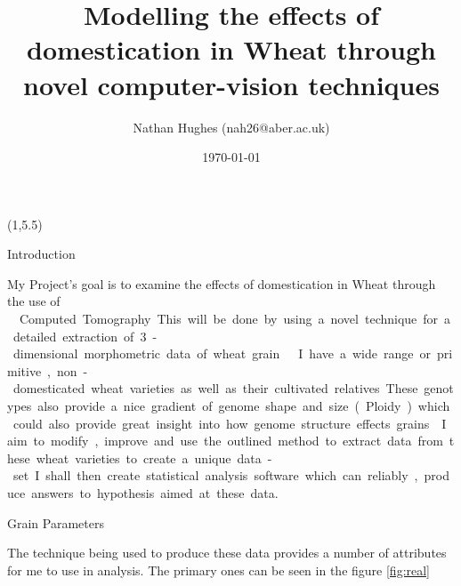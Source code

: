 \documentclass[final]{beamer}
\title{Modelling the effects of domestication in Wheat through novel computer-vision techniques}
\author{Nathan Hughes (nah26@aber.ac.uk)}
\date{\today}
\begin{document}
\begin{frame}{}

  \begin{textblock}{28}(1,5.5)

    \begin{block}{Introduction}


      My Project's goal is to examine the effects of domestication in Wheat through the use of \si\micro\-Computed Tomography.
      This will be done by using a novel technique for a detailed extraction of 3-dimensional morphometric data of wheat grain \cite{hughes2017}.

      \vspace{0.5cm}

      I have a wide range or primitive, non-domesticated wheat varieties
      as well as their cultivated relatives. These genotypes also provide a nice gradient of genome shape and size (Ploidy)
      which could also provide great insight into how genome structure effects grains.

      \vspace{0.5cm}

      I aim to modify, improve and use the outlined method to extract data from these wheat varieties to create a unique data-set.
      I shall then create statistical analysis software which can reliably, produce answers to hypothesis aimed at these data.

    \end{block}


    \begin{block}{Grain Parameters}

      The technique being used to produce these data provides a number of attributes for me to use in
      analysis. The primary ones can be seen in the figure \ref{fig:real}


\end{block}
\end{textblock}
\end{frame}
\end{document}
